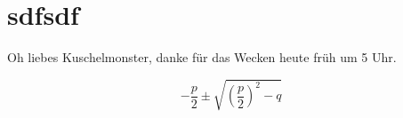 \documentclass[12pt,ngerman]{scrartcl}
\begin{document}
\section{sdfsdf}

Oh liebes Kuschelmonster, danke für das Wecken heute früh um 5 Uhr.

\[
- \frac{p}{2} \pm \sqrt{ \left( \frac{p}{2}\right)^2 -q  }
\]
\end{document}
